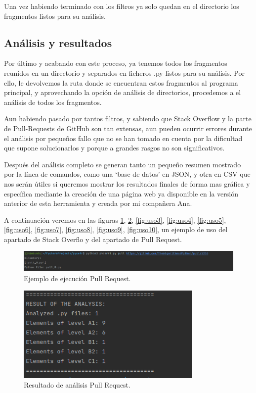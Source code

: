 \documentclass[a4paper, 12pt]{book}
\begin{document}
Una vez habiendo terminado con los filtros ya solo quedan en el directorio los fragmentos listos para su análisis.

\subsection{Análisis y resultados}

Por último y acabando con este proceso, ya tenemos todos los fragmentos reunidos en un directorio y separados en ficheros .py listos para su análisis. Por ello, le devolvemos la ruta donde se encuentran estos fragmentos al programa principal, y aprovechando la opción de análisis de directorios, procedemos a el análisis de todos los fragmentos.

Aun habiendo pasado por tantos filtros, y sabiendo que Stack Overflow y la parte de Pull-Requests de GitHub son tan extensas, aun pueden ocurrir errores durante el análisis por pequeños fallo que no se han tomado en cuenta por la dificultad que supone solucionarlos y porque a grandes rasgos no son significativos.

Después del análisis completo se generan tanto un pequeño resumen mostrado por la línea de comandos, como una `base de datos' en JSON, y otra en CSV que nos serán útiles si queremos mostrar los resultados finales de forma mas gráfica y específica mediante la creación de una página web ya disponible en la versión anterior de esta herramienta y creada por mi compañera Ana. 

A continuación veremos en las figuras \ref{fig:uso1}, \ref{fig:uso2}, \ref{fig:uso3}, \ref{fig:uso4}, \ref{fig:uso5}, \ref{fig:uso6}, \ref{fig:uso7}, \ref{fig:uso8}, \ref{fig:uso9}, \ref{fig:uso10}, un ejemplo de uso del apartado de Stack Overflo y del apartado de Pull Request.

\begin{figure}
  \centering
  \includegraphics[width=1\textwidth]{img/uso1.png}
  \caption{Ejemplo de ejecución Pull Request.}\label{fig:uso1}
\end{figure}

\begin{figure}
  \centering
  \includegraphics[width=9cm, keepaspectratio]{img/uso2.png}
  \caption{Resultado de análisis Pull Request.}\label{fig:uso2}
\end{figure}
\end{document}
